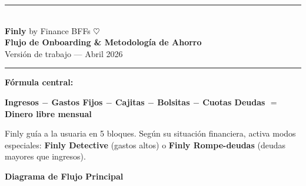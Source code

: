 \documentclass[a4paper,11pt]{article}
\begin{document}
\begin{center}
  {\color{cpink}\rule{\linewidth}{2pt}}\\[6pt]
  {\fontsize{30}{36}\selectfont\bfseries\color{cpink}Finly}
  \quad
  {\large\color{cdark!40}by Finance BFFs \textcolor{cpink}{$\heartsuit$}}\\[4pt]
  {\Large\bfseries\color{cdark}Flujo de Onboarding \& Metodolog\'ia de Ahorro}\\[4pt]
  {\small\color{cdark!50}Versi\'on de trabajo --- Abril 2026}\\[6pt]
  {\color{cpink}\rule{\linewidth}{2pt}}
\end{center}

\vspace{0.4cm}

\begin{mdframed}[backgroundcolor=cbg,linecolor=clpink,linewidth=1.2pt,roundcorner=8pt,
  innertopmargin=8pt,innerbottommargin=8pt]
\textbf{\color{cpink}F\'ormula central:}\\[4pt]
\begin{center}
\colorbox{cpink}{\color{white}\textbf{%
  Ingresos $-$ Gastos Fijos $-$ Cajitas $-$ Bolsitas $-$ Cuotas Deudas
  $=$ Dinero libre mensual}}
\end{center}
\vspace{4pt}
\textcolor{cdark!70}{\small
Finly gu\'ia a la usuaria en 5 bloques. Seg\'un su situaci\'on financiera,
activa modos especiales: \textbf{Finly Detective} (gastos altos)
o \textbf{Finly Rompe-deudas} (deudas mayores que ingresos).
}
\end{mdframed}

\vspace{0.5cm}

\begin{center}
{\large\bfseries\color{cdark}Diagrama de Flujo Principal}
\end{center}
\vspace{0.2cm}
\end{document}
